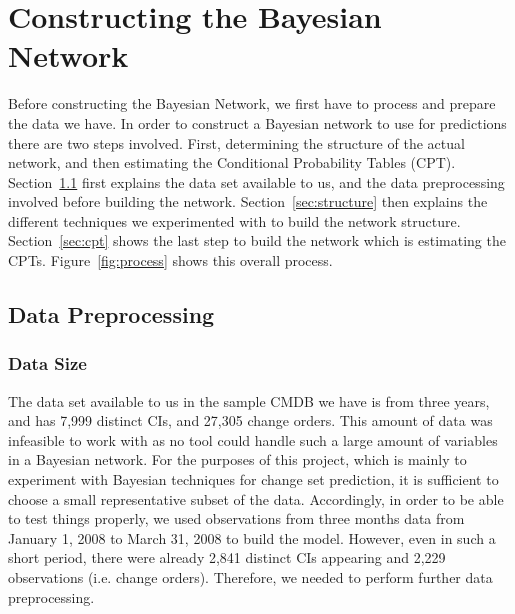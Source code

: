 \documentclass[10pt,twocolumn,letterpaper]{article}
\begin{document}
\section{Constructing the Bayesian Network}
\label{sec:constructing}

Before constructing the Bayesian Network, we first have to process and prepare the data we have. In order to construct a Bayesian network to use for
predictions there are two steps involved. First, determining the structure of the actual network, and then estimating the Conditional Probability Tables
(CPT). Section~\ref{sec:data} first explains the data set available to us, and the data preprocessing involved before building the network.
Section~\ref{sec:structure} then explains the different techniques we experimented with to build the network structure. Section~\ref{sec:cpt} shows the last
step to build the network which is estimating the CPTs. Figure~\ref{fig:process} shows this overall process.

\subsection{Data Preprocessing}
\label{sec:data}

\subsubsection*{Data Size}
The data set available to us in the sample CMDB we have is from three years, and has 7,999 distinct CIs, and 27,305 change orders. This amount of data
was infeasible to work with as no tool could handle such a large amount of variables in a Bayesian network. For the purposes of this project, which is mainly to
experiment with Bayesian techniques for change set prediction, it is sufficient to choose a small representative subset of the data. Accordingly, in order to be
able to test things properly, we used observations from three months data from January 1, 2008 to March 31, 2008 to build the model. However, even in such a
short period, there were already 2,841 distinct CIs appearing and 2,229 observations (i.e. change orders). Therefore, we needed to perform further data
preprocessing. 
\end{document}
